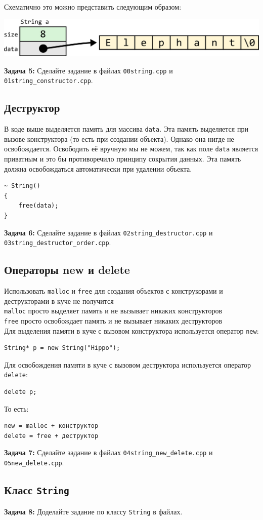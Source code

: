 \documentclass{article}
\begin{document}
Схематично это можно представить следующим образом:
\begin{center}
\includegraphics[scale=0.86]{../images/string_base.png}
\end{center}

\textbf{Задача 5:} Сделайте задание в файлах \texttt{00string.cpp} и \texttt{01string\_constructor.cpp}.
\newpage
\subsection*{Деструктор}
В коде выше выделяется память для массива \texttt{data}. Эта память выделяется при вызове конструктора (то есть при создании объекта). Однако она нигде не освобождается. Освободить её вручную мы не можем, так как поле \texttt{data} является приватным и это бы противоречило принципу сокрытия данных. Эта память должна освобождаться автоматически при удалении объекта.
\begin{lstlisting}
~ String()
{
	free(data);
}
\end{lstlisting}
\textbf{Задача 6:} Сделайте задание в файлах \texttt{02string\_destructor.cpp} и \texttt{03string\_destructor\_order.cpp}.

\subsection*{Операторы new и delete}
Использовать \texttt{malloc} и \texttt{free} для создания объектов с конструкорами и деструкторами в куче не получится\\
\texttt{malloc} просто выделяет память и не вызывает никаких конструкторов\\
\texttt{free} просто освобождает память и не вызывает никаких деструкторов\\
Для выделения памяти в куче с вызовом конструктора используется оператор \texttt{new}:
\begin{lstlisting}
String* p = new String("Hippo");
\end{lstlisting}
Для освобождения памяти в куче с вызовом деструктора используется оператор \texttt{delete}:
\begin{lstlisting}
delete p;
\end{lstlisting}
То есть:\\
\begin{verbatim}
new = malloc + конструктор
delete = free + деструктор
\end{verbatim}
\textbf{Задача 7:} Сделайте задание в файлах \texttt{04string\_new\_delete.cpp} и \texttt{05new\_delete.cpp}.

\subsection*{Класс \texttt{String}}
\textbf{Задача 8:} Доделайте задание по классу \texttt{String} в файлах.
\end{document}
